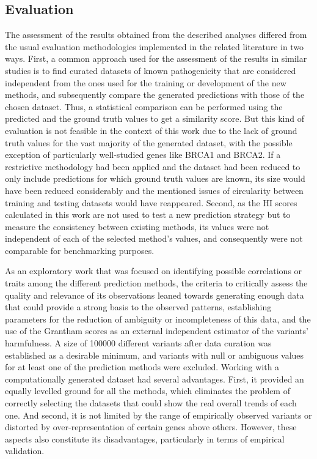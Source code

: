 \documentclass[12pt,MSc,wordcount,anon]{muthesis}
\begin{document}
\begin{flushleft}
\section{Evaluation}

The assessment of the results obtained from the described analyses differed from the usual evaluation methodologies implemented in the related literature in two ways. First, a common approach used for the assessment of the results in similar studies is to find curated datasets of known pathogenicity that are considered independent from the ones used for the training or development of the new methods, and subsequently compare the generated predictions with those of the chosen dataset. Thus, a statistical comparison can be performed using the predicted and the ground truth values to get a similarity score. But this kind of evaluation is not feasible in the context of this work due to the lack of ground truth values for the vast majority of the generated dataset, with the possible exception of particularly well-studied genes like BRCA1 and BRCA2. If a restrictive methodology had been applied and the dataset had been reduced to only include predictions for which ground truth values are known, its size would have been reduced considerably and the mentioned issues of circularity between training and testing datasets would have reappeared. Second, as the HI scores calculated in this work are not used to test a new prediction strategy but to measure the consistency between existing methods, its values were not independent of each of the selected method's values, and consequently were not comparable for benchmarking purposes.

As an exploratory work that was focused on identifying possible correlations or traits among the different prediction methods, the criteria to critically assess the quality and relevance of its observations leaned towards generating enough data that could provide a strong basis to the observed patterns, establishing parameters for the reduction of ambiguity or incompleteness of this data, and the use of the Grantham scores as an external independent estimator of the variants' harmfulness. A size of 100000 different variants after data curation was established as a desirable minimum, and variants with null or ambiguous values for at least one of the prediction methods were excluded.
Working with a computationally generated dataset had several advantages. First, it provided an equally levelled ground for all the methods, which eliminates the problem of correctly selecting the datasets that could show the real overall trends of each one. And second, it is not limited by the range of empirically observed variants or distorted by over-representation of certain genes above others. However, these aspects also constitute its disadvantages, particularly in terms of empirical validation.


\end{flushleft}
\end{document}
